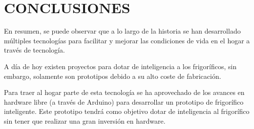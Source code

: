 \section{CONCLUSIONES}

En resumen, se puede observar que a lo largo de la historia se han desarrollado múltiples tecnologías para facilitar y mejorar las condiciones de vida en el hogar a través de tecnología.


A día de hoy existen proyectos para dotar de inteligencia a los frigoríficos, sin embargo, solamente son prototipos debido a su alto coste de fabricación.

Para traer al hogar parte de esta tecnología se ha aprovechado de los avances en hardware libre (a través de Arduino) para desarrollar un prototipo de frigorífico inteligente. Este prototipo tendrá como objetivo dotar de inteligencia al frigorífico sin tener que realizar una gran inversión en hardware.